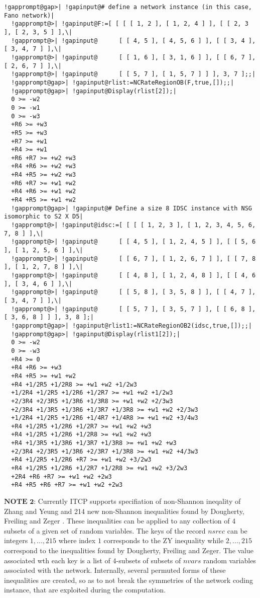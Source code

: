 \documentclass[a4paper,11pt]{report}
\begin{document}
{{ 
\begin{Verbatim}[commandchars=!@|,fontsize=\small,frame=single,label=Example]
  !gapprompt@gap>| !gapinput@# define a network instance (in this case, Fano network)|
  !gapprompt@>| !gapinput@F:=[ [ [ [ 1, 2 ], [ 1, 2, 4 ] ], [ [ 2, 3 ], [ 2, 3, 5 ] ],\|
  !gapprompt@>| !gapinput@      [ [ 4, 5 ], [ 4, 5, 6 ] ], [ [ 3, 4 ], [ 3, 4, 7 ] ],\|
  !gapprompt@>| !gapinput@      [ [ 1, 6 ], [ 3, 1, 6 ] ], [ [ 6, 7 ], [ 2, 6, 7 ] ],\|
  !gapprompt@>| !gapinput@      [ [ 5, 7 ], [ 1, 5, 7 ] ] ], 3, 7 ];;|
  !gapprompt@gap>| !gapinput@rlist:=NCRateRegionOB(F,true,[]);;|
  !gapprompt@gap>| !gapinput@Display(rlist[2]);|
  0 >= -w2
  0 >= -w1
  0 >= -w3
  +R6 >= +w3
  +R5 >= +w3
  +R7 >= +w1
  +R4 >= +w1
  +R6 +R7 >= +w2 +w3
  +R4 +R6 >= +w2 +w3
  +R4 +R5 >= +w2 +w3
  +R6 +R7 >= +w1 +w2
  +R4 +R6 >= +w1 +w2
  +R4 +R5 >= +w1 +w2
  !gapprompt@gap>| !gapinput@# Define a size 8 IDSC instance with NSG isomorphic to S2 X D5|
  !gapprompt@>| !gapinput@idsc:=[ [ [ [ 1, 2, 3 ], [ 1, 2, 3, 4, 5, 6, 7, 8 ] ],\|
  !gapprompt@>| !gapinput@      [ [ 4, 5 ], [ 1, 2, 4, 5 ] ], [ [ 5, 6 ], [ 1, 2, 5, 6 ] ],\|
  !gapprompt@>| !gapinput@      [ [ 6, 7 ], [ 1, 2, 6, 7 ] ], [ [ 7, 8 ], [ 1, 2, 7, 8 ] ],\|
  !gapprompt@>| !gapinput@      [ [ 4, 8 ], [ 1, 2, 4, 8 ] ], [ [ 4, 6 ], [ 3, 4, 6 ] ],\|
  !gapprompt@>| !gapinput@      [ [ 5, 8 ], [ 3, 5, 8 ] ], [ [ 4, 7 ], [ 3, 4, 7 ] ],\|
  !gapprompt@>| !gapinput@      [ [ 5, 7 ], [ 3, 5, 7 ] ], [ [ 6, 8 ], [ 3, 6, 8 ] ] ], 3, 8 ];|
  !gapprompt@gap>| !gapinput@rlist1:=NCRateRegionOB2(idsc,true,[]);;|
  !gapprompt@gap>| !gapinput@Display(rlist1[2]);|
  0 >= -w2
  0 >= -w3
  +R4 >= 0
  +R4 +R6 >= +w3
  +R4 +R5 >= +w1 +w2
  +R4 +1/2R5 +1/2R8 >= +w1 +w2 +1/2w3
  +1/2R4 +1/2R5 +1/2R6 +1/2R7 >= +w1 +w2 +1/2w3
  +2/3R4 +2/3R5 +1/3R6 +1/3R8 >= +w1 +w2 +2/3w3
  +2/3R4 +1/3R5 +1/3R6 +1/3R7 +1/3R8 >= +w1 +w2 +2/3w3
  +1/2R4 +1/2R5 +1/2R6 +1/4R7 +1/4R8 >= +w1 +w2 +3/4w3
  +R4 +1/2R5 +1/2R6 +1/2R7 >= +w1 +w2 +w3
  +R4 +1/2R5 +1/2R6 +1/2R8 >= +w1 +w2 +w3
  +R4 +1/3R5 +1/3R6 +1/3R7 +1/3R8 >= +w1 +w2 +w3
  +2/3R4 +2/3R5 +1/3R6 +2/3R7 +1/3R8 >= +w1 +w2 +4/3w3
  +R4 +1/2R5 +1/2R6 +R7 >= +w1 +w2 +3/2w3
  +R4 +1/2R5 +1/2R6 +1/2R7 +1/2R8 >= +w1 +w2 +3/2w3
  +2R4 +R6 +R7 >= +w1 +w2 +2w3
  +R4 +R5 +R6 +R7 >= +w1 +w2 +2w3
\end{Verbatim}
 $\textbf{NOTE 2:}$ Currently ITCP supports specifiation of non-Shannon ineqality of Zhang and
Yeung \cite{zyineq97} and 214 new non-Shannon inequalities found by Dougherty, Freiling and Zeger \cite{dfznonshannon}. These inequalities can be applied to any collection of 4 subsets of a given
set of random variables. The keys of the record $nsrec$ can be integers $1,...,215$ where index $1$ corresponds to the ZY inequality while $2,...,215$ correspond to the inequalities found by Dougherty, Freiling and Zeger. The
value associated wth each key is a list of 4-subsets of subsets of $nvars$ random variables associated with the network. Internally, several permuted
forms of these inequalities are created, so as to not break the symmetries of
the network coding instance, that are exploited during the computation. 

}}
\end{document}
